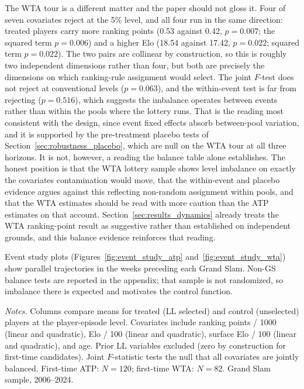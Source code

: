 The WTA tour is a different matter and the paper should not gloss it. Four of seven covariates reject at the 5\% level, and all four run in the same direction: treated players carry more ranking points (0.53 against 0.42, $p = 0.007$; the squared term $p = 0.006$) and a higher Elo (18.54 against 17.42, $p = 0.022$; squared term $p = 0.022$). The two pairs are collinear by construction, so this is roughly two independent dimensions rather than four, but both are precisely the dimensions on which ranking-rule assignment would select. The joint $F$-test does not reject at conventional levels ($p = 0.063$), and the within-event test is far from rejecting ($p = 0.516$), which suggests the imbalance operates between events rather than within the pools where the lottery runs. That is the reading most consistent with the design, since event fixed effects absorb between-pool variation, and it is supported by the pre-treatment placebo tests of Section~\ref{sec:robustness_placebo}, which are null on the WTA tour at all three horizons. It is not, however, a reading the balance table alone establishes. The honest position is that the WTA lottery sample shows level imbalance on exactly the covariates contamination would move, that the within-event and placebo evidence argues against this reflecting non-random assignment within pools, and that the WTA estimates should be read with more caution than the ATP estimates on that account. Section~\ref{sec:results_dynamics} already treats the WTA ranking-point result as suggestive rather than established on independent grounds, and this balance evidence reinforces that reading.

Event study plots (Figures~\ref{fig:event_study_atp} and~\ref{fig:event_study_wta}) show parallel trajectories in the weeks preceding each Grand Slam. Non-GS balance tests are reported in the appendix; that sample is not randomized, so imbalance there is expected and motivates the control function.

\begin{table}[htbp]
\centering
\caption{Pre-Treatment Balance: Grand Slam Samples}
\label{tab:balance}
\begin{threeparttable}
\small

\begin{tablenotes}
\footnotesize
\item \textit{Notes.} Columns compare means for treated (LL selected) and control (unselected) players at the player-episode level. Covariates include ranking points / 1000 (linear and quadratic), Elo / 100 (linear and quadratic), surface Elo / 100 (linear and quadratic), and age. Prior LL variables excluded (zero by construction for first-time candidates). Joint $F$-statistic tests the null that all covariates are jointly balanced. First-time ATP: $N = 120$; first-time WTA: $N = 82$. Grand Slam sample, 2006--2024.
\end{tablenotes}
\end{threeparttable}
\end{table}

